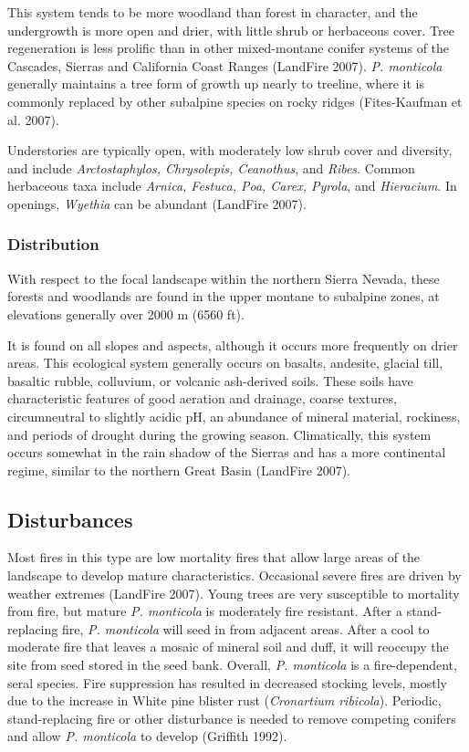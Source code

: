 This system tends to be more woodland than forest in character, and the undergrowth is more open and drier, with little shrub or herbaceous cover. Tree regeneration is less prolific than in other mixed-montane conifer systems of the Cascades, Sierras and California Coast Ranges (LandFire 2007). \emph{P. monticola} generally maintains a tree form of growth up nearly to treeline, where it is commonly replaced by other subalpine species on rocky ridges (Fites-Kaufman et al. 2007).

Understories are typically open, with moderately low shrub cover and diversity, and include \emph{Arctostaphylos, Chrysolepis, Ceanothus}, and \emph{Ribes}. Common herbaceous taxa include \emph{Arnica, Festuca, Poa, Carex, Pyrola}, and \emph{Hieracium}. In openings, \emph{Wyethia} can be abundant (LandFire 2007).


\subsubsection{Distribution}
With respect to the focal landscape within the northern Sierra Nevada, these forests and woodlands are found in the upper montane to subalpine zones, at elevations generally over 2000 m (6560 ft). 

It is found on all slopes and aspects, although it occurs more frequently on drier areas. This ecological system generally occurs on basalts, andesite, glacial till, basaltic rubble, colluvium, or volcanic ash-derived soils. These soils have characteristic features of good aeration and drainage, coarse textures, circumneutral to slightly acidic pH, an abundance of mineral material, rockiness, and periods of drought during the growing season. Climatically, this system occurs somewhat in the rain shadow of the Sierras and has a more continental regime, similar to the northern Great Basin (LandFire 2007).


\subsection*{Disturbances}
Most fires in this type are low mortality fires that allow large areas of the landscape to develop mature characteristics. Occasional severe fires are driven by weather extremes (LandFire 2007). Young trees are very susceptible to mortality from fire, but mature \emph{P. monticola} is moderately fire resistant. After a stand-replacing fire, \emph{P. monticola} will seed in from adjacent areas. After a cool to moderate fire that leaves a mosaic of mineral soil and duff, it will reoccupy the site from seed stored in the seed bank. Overall, \emph{P. monticola} is a fire-dependent, seral species. Fire suppression has resulted in decreased stocking levels, mostly due to the increase in White pine blister rust (\emph{Cronartium ribicola}). Periodic, stand-replacing fire or other disturbance is needed to remove competing conifers and allow \emph{P. monticola} to develop (Griffith 1992). 

